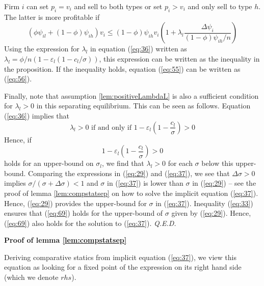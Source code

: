 \documentclass[12pt,english,a4paper]{article}
\newcommand{\qed}{\hspace*{\fill} {\em Q.E.D.}}
\begin{document}
Firm \(i\) can set \(p_i = v_i\) and sell to both types or set \(p_i>v_i\) and only sell to type \(h\). The latter is more profitable if
\begin{equation}
\label{eq:3}
(\phi \psi_{il} + (1-\phi)\psi_{ih})v_i \leq (1-\phi)\psi_{ih} v_i \left( 1+\lambda_l \frac{\Delta \psi_i}{(1-\phi)\psi_{ih}/n} \right)
\end{equation}
Using the expression for \(\lambda_l\) in equation (\ref{eq:36}) written as \(\lambda_l = \phi/n (1 - \varepsilon_l (1-c_{l}/\sigma))\), this expression can be written as the inequality in the proposition. If the inequality holds, equation (\ref{eq:55}) can be written as (\ref{eq:56}).

Finally, note that assumption \ref{lem:positiveLambdaL} is also a sufficient condition for \(\lambda_l > 0\) in this separating equilibrium. This can be seen as follows. Equation (\ref{eq:36}) implies that
\begin{equation}
\label{eq:68}
\lambda_l > 0 \text{ if and only if } 1-\varepsilon_l \left(1-\frac{c_l}{\sigma} \right) > 0
\end{equation}
Hence, if
\begin{equation}
\label{eq:69}
1-\varepsilon_l \left(1-\frac{c_l}{\sigma} \right) > 0
\end{equation}
holds for an upper-bound on \(\sigma_l\), we find that \(\lambda_l > 0\) for each \(\sigma\) below this upper-bound. Comparing the expressions in (\ref{eq:29}) and (\ref{eq:37}), we see that \(\Delta \sigma > 0\) implies \(\sigma/(\sigma+\Delta\sigma)<1\) and \(\sigma\) in (\ref{eq:37}) is lower than \(\sigma\) in (\ref{eq:29}) -- see the proof of lemma \ref{lem:compstatsep} on how to solve the implicit equation (\ref{eq:37}). Hence, (\ref{eq:29}) provides the upper-bound for \(\sigma\) in (\ref{eq:37}). Inequality (\ref{eq:33}) ensures that (\ref{eq:69}) holds for the upper-bound of \(\sigma\) given by (\ref{eq:29}). Hence, (\ref{eq:69}) also holds for the solution to (\ref{eq:37}).\qed

\textbf{Proof of lemma \ref{lem:compstatsep}}

Deriving comparative statics from implicit equation (\ref{eq:37}), we view this equation as looking for a fixed point of the expression on its right hand side (which we denote \(rhs\)).
\end{document}
